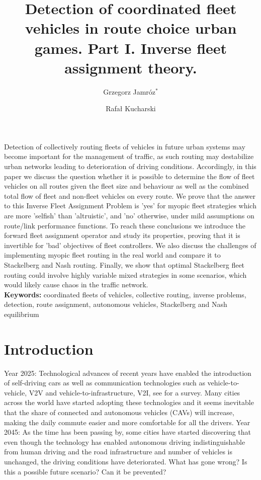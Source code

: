 \documentclass[a4paper,11pt]{article}
\begin{document}
\title{\bf Detection of coordinated fleet vehicles in route choice urban games. Part I. Inverse fleet assignment theory.}
\author[1]{Grzegorz Jamr\'oz$^*$}
\author[1]{Rafa{\l}  Kucharski}
\setcounter{Maxaffil}{0}
\renewcommand\Affilfont{\itshape\small}
\maketitle

 Detection of collectively routing fleets of vehicles in future urban systems may become important for the management of traffic, as such routing may destabilize urban networks leading to deterioration of driving conditions. Accordingly, in this paper we discuss the question whether it is possible to determine the flow of fleet vehicles on all routes given the fleet size and behaviour as well as the combined total flow of fleet and non-fleet vehicles on every route. We prove that the answer to this Inverse Fleet Assignment Problem is 'yes' for myopic fleet strategies which are more 'selfish' than 'altruistic', and 'no' otherwise, under mild assumptions on route/link performance functions. To reach these conclusions we introduce the forward fleet assignment operator and study its properties, proving that it is invertible for 'bad' objectives of fleet controllers.  We also discuss the challenges of implementing myopic fleet routing in the real world and compare it to Stackelberg and Nash routing. Finally, we show that optimal Stackelberg fleet routing could involve highly variable mixed strategies in some scenarios, which would likely cause chaos in the traffic network. 
\,\\
{\bf Keywords:} coordinated fleets of vehicles, collective routing, inverse problems, detection, route assignment, autonomous vehicles, Stackelberg and Nash equilibrium


\section{Introduction}

Year 2025: Technological advances of recent years have enabled the introduction of self-driving cars \cite{Maurer} as well as communication technologies such as vehicle-to-vehicle, V2V and vehicle-to-infrastructure, V2I, see \cite{V2X} for a survey. Many cities across the world \cite{YourCity, EU, China} have started adopting these technologies and it seems inevitable that the share of connected and autonomous vehicles (CAVs) will increase, making the daily commute easier and more comfortable for all the drivers. Year 2045: As the time has been passing by, some cities have started discovering that even though the technology has enabled autonomous driving indistinguishable from human driving and the road infrastructure and number of vehicles is unchanged, the driving conditions have deteriorated. What has gone wrong? Is this a possible future scenario? Can it be prevented?
\end{document}
